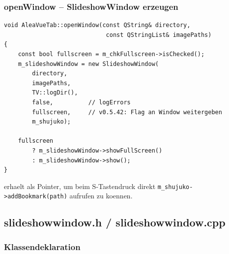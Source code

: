 \subsubsection{openWindow -- SlideshowWindow erzeugen}

\begin{lstlisting}[caption={openWindow: Vollbild- oder Fenstermodus}]
void AleaVueTab::openWindow(const QString& directory,
                             const QStringList& imagePaths)
{
    const bool fullscreen = m_chkFullscreen->isChecked();
    m_slideshowWindow = new SlideshowWindow(
        directory,
        imagePaths,
        TV::logDir(),
        false,          // logErrors
        fullscreen,     // v0.5.42: Flag an Window weitergeben
        m_shujuko);

    fullscreen
        ? m_slideshowWindow->showFullScreen()
        : m_slideshowWindow->show();
}
\end{lstlisting}

 erhaelt  als
Pointer, um beim S-Tastendruck direkt
\verb|m_shujuko->addBookmark(path)| aufrufen zu koennen.

\subsection{slideshowwindow.h / slideshowwindow.cpp}

\subsubsection{Klassendeklaration}

